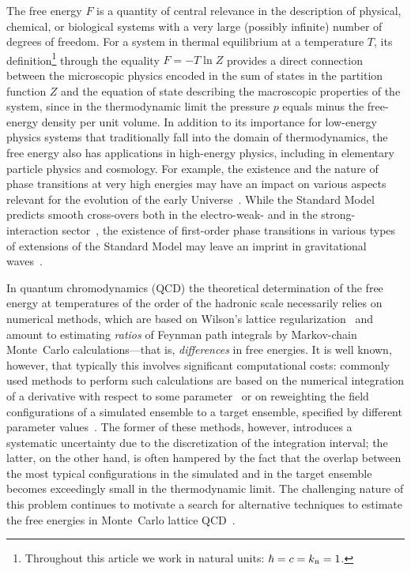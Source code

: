 \documentclass[11pt]{article}
\newcommand{\kB}{k_{\mbox{\tiny{B}}}}
\begin{document}
The free energy $F$ is a quantity of central relevance in the description of physical, chemical, or biological systems with a very large (possibly infinite) number of degrees of freedom. For a system in thermal equilibrium at a temperature $T$, its definition\footnote{Throughout this article we work in natural units: $\hbar=c=\kB=1$.} through the equality $F= -T \ln Z$ provides a direct connection between the microscopic physics encoded in the sum of states in the partition function $Z$ and the equation of state describing the macroscopic properties of the system, since in the thermodynamic limit the pressure $p$ equals minus the free-energy density per unit volume. In addition to its importance for low-energy physics systems that traditionally fall into the domain of thermodynamics, the free energy also has applications in high-energy physics, including in elementary particle physics and cosmology. For example, the existence and the nature of phase transitions at very high energies may have an impact on various aspects relevant for the evolution of the early Universe~\cite{Schwarz:2003du, Caprini:2019egz}. While the Standard Model predicts smooth cross-overs both in the electro-weak- and in the strong-interaction sector~\cite{Kajantie:1996mn, Kajantie:1995kf, Aoki:2006we, Bazavov:2011nk}, the existence of first-order phase transitions in various types of extensions of the Standard Model may leave an imprint in gravitational waves~\cite{Witten:1984rs, Hogan:1986qda, Kosowsky:1992rz}.

In quantum chromodynamics (QCD) the theoretical determination of the free energy at temperatures of the order of the hadronic scale necessarily relies on numerical methods, which are based on Wilson's lattice regularization~\cite{Wilson:1974sk} and amount to estimating \emph{ratios} of Feynman path integrals by Markov-chain Monte~Carlo calculations---that is, \emph{differences} in free energies. It is well known, however, that typically this involves significant computational costs: commonly used methods to perform such calculations are based on the numerical integration of a derivative with respect to some parameter~\cite{Engels:1990vr} or on reweighting the field configurations of a simulated ensemble to a target ensemble, specified by different parameter values~\cite{Ferrenberg:1988yz}. The former of these methods, however, introduces a systematic uncertainty due to the discretization of the integration interval; the latter, on the other hand, is often hampered by the fact that the overlap between the most typical configurations in the simulated and in the target ensemble becomes exceedingly small in the thermodynamic limit. The challenging nature of this problem continues to motivate a search for alternative techniques to estimate the free energies in Monte~Carlo lattice QCD~\cite{Langfeld:2012ah, Asakawa:2013laa, Langfeld:2014nta, Kitazawa:2016dsl, Giusti:2016iqr, Kanaya:2016rkt, DallaBrida:2017sxr, Hirakida:2018uoy, Iritani:2018idk}. 
\end{document}
